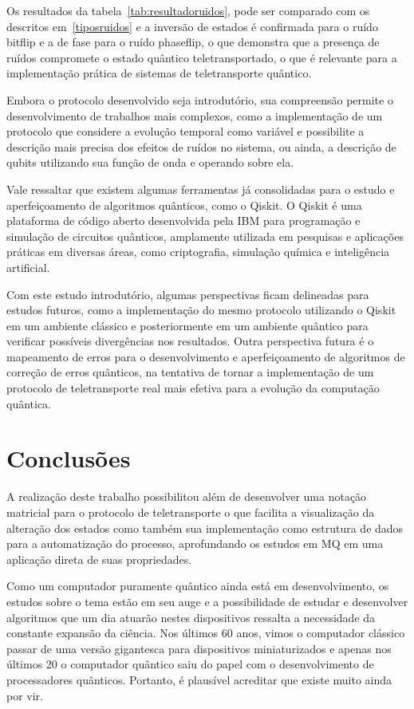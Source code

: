 Os resultados da tabela~\ref{tab:resultadoruidos}, pode ser comparado com os descritos em~\ref{tiposruidos} e a inversão de estados é confirmada para o ruído bitflip e a de fase para o ruído phaseflip, o que demonstra que a presença de ruídos compromete o estado quântico teletransportado, o que é relevante para a implementação prática de sistemas de teletransporte quântico.

Embora o protocolo desenvolvido seja introdutório, sua compreensão permite o desenvolvimento de trabalhos mais complexos, como a implementação de um protocolo que considere a evolução temporal como variável e possibilite a descrição mais precisa dos efeitos de ruídos no sistema, ou ainda, a descrição de qubits utilizando sua função de onda e operando sobre ela.

Vale ressaltar que existem algumas ferramentas já consolidadas para o estudo e aperfeiçoamento de algoritmos quânticos, como o Qiskit. O Qiskit é uma plataforma de código aberto desenvolvida pela IBM para programação e simulação de circuitos quânticos, amplamente utilizada em pesquisas e aplicações práticas em diversas áreas, como criptografia, simulação química e inteligência artificial.

Com este estudo introdutório, algumas perspectivas ficam delineadas para estudos futuros, como a implementação do mesmo protocolo utilizando o Qiskit em um ambiente clássico e posteriormente em um ambiente quântico para verificar possíveis divergências nos resultados. Outra perspectiva futura é o mapeamento de erros para o desenvolvimento e aperfeiçoamento de algoritmos de correção de erros quânticos, na tentativa de tornar a implementação de um protocolo de teletransporte real mais efetiva para a evolução da computação quântica.

\clearpage

\chapter{Conclusões}

A realização deste trabalho possibilitou além de desenvolver uma notação matricial para o protocolo de teletransporte o que facilita a visualização da alteração dos estados como também sua implementação como estrutura de dados para a automatização do processo, aprofundando os estudos em MQ em uma aplicação direta de suas propriedades.

Como um computador puramente quântico ainda está em desenvolvimento, os estudos sobre o tema estão em seu auge e a possibilidade de estudar e desenvolver algoritmos que um dia atuarão nestes dispositivos ressalta a necessidade da constante expansão da ciência. Nos últimos 60 anos, vimos o computador clássico passar de uma versão gigantesca para dispositivos miniaturizados e apenas nos últimos 20 o computador quântico saiu do papel com o desenvolvimento de processadores quânticos. Portanto, é plausível acreditar que existe muito ainda por vir.

